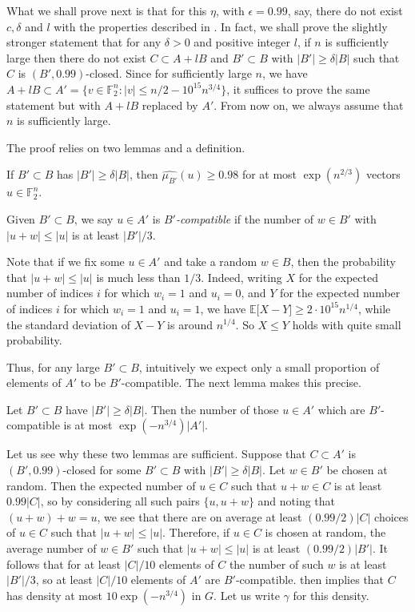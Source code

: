 \documentclass{toc}
\newcommand\eps{\epsilon}  %
\newcommand\E{\mathbb{E}}
\newcommand\F{\mathbb{F}}
\newcommand\g{\gamma}
\renewcommand\d{\delta}
\newcommand \s{\subset}
\begin{document}
%
%
What we shall prove
next  %
is that for this $\eta$, with $\eps=0.99$, say, there do not exist $c,\d$ and $l$ with the properties described in . In fact, we shall prove the slightly stronger statement that for any $\delta>0$ and positive integer $l$, if $n$ is sufficiently large then there do not exist $C\subset A+lB$ and $B'\subset B$ with $|B'|\geq \d |B|$ such that $C$ is $(B',0.99)$-closed. Since for sufficiently large $n$, we have $A+lB\subset A'=\{v\in \F_2^n:|v|\leq n/2-10^{15}n^{3/4}\}$, it suffices to prove the same statement but with $A+lB$ replaced by $A'$. From now on, we always assume that $n$ is sufficiently large.

The proof relies on two lemmas and a definition.

\begin{lemma} \label{fourier}
	If $B'\subset B$ has $|B'|\geq \delta |B|$, then $\widehat{\mu_{B'}}(u)\geq 0.98$ for at most $\exp(n^{2/3})$ vectors $u\in \F_2^n$.
\end{lemma}

\begin{definition}
	Given $B'\subset B$, we say $u\in A'$ is \emph{$B'$-compatible} if the number of $w\in B'$ with $|u+w|\leq |u|$ is at least $|B'|/3$.
\end{definition}

Note that if we fix some $u\in A'$ and take a random $w\in B$, then the probability that $|u+w|\leq |u|$ is much less than $1/3$. Indeed, writing $X$ for the expected number of indices $i$ for which $w_i=1$ and $u_i=0$, and $Y$ for the expected number of indices $i$ for which $w_i=1$ and $u_i=1$, we have $\E\lbrack X-Y\rbrack\geq 2\cdot 10^{15}n^{1/4}$, while the standard deviation of $X-Y$ is around $n^{1/4}$. So $X\leq Y$ holds with quite small probability.

Thus, for any large $B'\s B$, intuitively we expect only a small proportion of elements of $A'$ to be $B'$-compatible. The next lemma makes this precise.

\begin{lemma} \label{compatible}
	Let $B'\subset B$ have $|B'|\geq\d|B|$. Then the number of those $u\in A'$ which are $B'$-compatible is at most $\exp(-n^{3/4})|A'|$.
\end{lemma}

\smallskip

\noindent Let us see why these two lemmas are sufficient. Suppose that $C\subset A'$ is $(B',0.99)$-closed for some $B'\subset B$ with $|B'|\geq \d|B|$. Let $w\in B'$ be chosen at random. Then the expected number of $u\in C$ such that $u+w\in C$ is at least $0.99|C|$, so by considering all such pairs $\{u,u+w\}$ and noting that $(u+w)+w=u$, we see that there are on average at least $({0.99}/2)|C|$ choices of $u\in C$ such that $|u+w|\leq|u|$. Therefore, if $u\in C$ is chosen at random, the average number of $w\in B'$ such that $|u+w|\leq|u|$ is at least $({0.99}/2)|B'|$. It follows that for at least $|C|/10$ elements of $C$ the number of such $w$ is at least $|B'|/3$, so at least $|C|/10$ elements of $A'$ are $B'$-compatible.  then implies that $C$ has density at most $10\exp(-n^{3/4})$ in $G$. Let us write $\g$ for this density.
\end{document}
